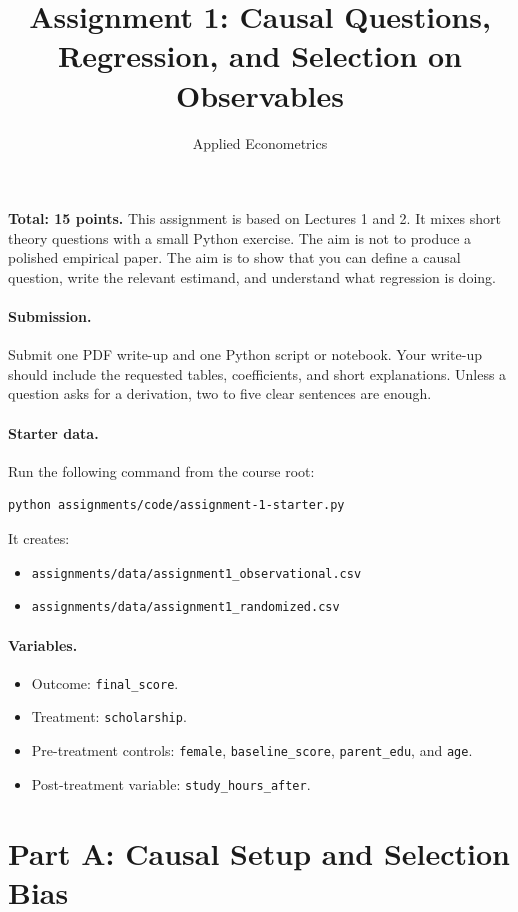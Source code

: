 \documentclass[11pt]{article}
\title{Assignment 1: Causal Questions, Regression, and Selection on Observables}
\author{Applied Econometrics}
\date{}
\begin{document}
\maketitle

\noindent\textbf{Total: 15 points.} This assignment is based on Lectures 1 and 2. It mixes short theory questions with a small Python exercise. The aim is not to produce a polished empirical paper. The aim is to show that you can define a causal question, write the relevant estimand, and understand what regression is doing.

\paragraph{Submission.} Submit one PDF write-up and one Python script or notebook. Your write-up should include the requested tables, coefficients, and short explanations. Unless a question asks for a derivation, two to five clear sentences are enough.

\paragraph{Starter data.} Run the following command from the course root:
\begin{lstlisting}
python assignments/code/assignment-1-starter.py
\end{lstlisting}
It creates:
\begin{itemize}
  \item \texttt{assignments/data/assignment1\_observational.csv}
  \item \texttt{assignments/data/assignment1\_randomized.csv}
\end{itemize}

\paragraph{Variables.}
\begin{itemize}
  \item Outcome: \texttt{final\_score}.
  \item Treatment: \texttt{scholarship}.
  \item Pre-treatment controls: \texttt{female}, \texttt{baseline\_score}, \texttt{parent\_edu}, and \texttt{age}.
  \item Post-treatment variable: \texttt{study\_hours\_after}.
\end{itemize}

\section*{Part A: Causal Setup and Selection Bias}
\end{document}
